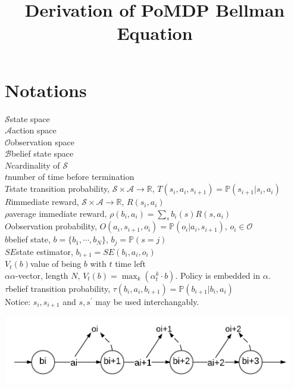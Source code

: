 \documentclass[a4paper,onecolumn]{article}
\begin{document}
\setcounter{page}{1}

\title{Derivation of PoMDP Bellman Equation}
\author{}
\date{}
\maketitle


\section{Notations}
$\mathcal{S}$\quad state space\\
$\mathcal{A}$\quad action space\\
$\mathcal{O}$\quad observation space\\
$\mathcal{B}$\quad belief state space\\
$N$\quad cardinality of $\mathcal{S}$\\
$t$\quad number of time before termination\\
$T$\quad state transition probability,
$\mathcal{S}\times\mathcal{A}\rightarrow \mathbb{R}$, $T(s_{i}, a_i,
s_{i+1}) = \mathbb{P}(s_{i+1}|s_i, a_i)$\\
$R$\quad immediate reward, $\mathcal{S}\times\mathcal{A}\rightarrow
\mathbb{R}$, $R(s_i, a_i)$\\
$\rho$\quad average immediate reward, $\rho(b_i, a_i) =
\sum_{s}b_i(s)R(s, a_i)$\\
$O$\quad observation probability, $O(a_i, s_{i+1}, o_i) =
\mathbb{P}(o_i|a_i, s_{i+1})$, $o_i\in \mathcal{O}$\\
$b$\quad belief state, $b=\{b_1, \cdots, b_N\}$, $b_j =
\mathbb{P}(s=j)$\\
$SE$\quad state estimator, $b_{i+1} = SE(b_i, a_i, o_i)$\\
$V_t(b)$\quad value of being $b$ with $t$ time left\\
$\alpha$\quad $\alpha$-vector, length $N$, $V_t(b) =
\max_k\left(\alpha^k_t\cdot b\right)$. Policy is embedded in $\alpha$.\\
$\tau$\quad belief transition probability, $\tau(b_i, a_i,
b_{i+1}) = \mathbb{P}(b_{i+1}|b_i, a_i)$\\
Notice: $s_i, s_{i+1}$ and $s, s^\prime$ may be used interchangably.

\begin{center}
\includegraphics[height=3cm]{beliefMC.png}
\end{center}
\end{document}
